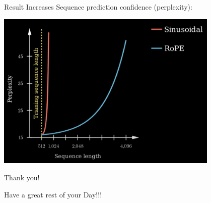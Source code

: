 \documentclass{beamer}
\begin{document}
\begin{frame}[t]{Result}
    Increases Sequence prediction confidence (perplexity):
    \begin{center}
        \includegraphics[width=0.8\textwidth]{./img/rope_5.png}
    \end{center}
\end{frame}

\begin{frame}{Thank you!}
	\begin{center}
        Have a great rest of your Day!!!
	\end{center}
	\begin{center}
	\end{center}
\end{frame}
\end{document}
